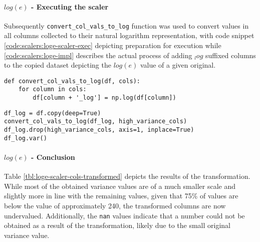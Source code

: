 \paragraph{$log(e)$ - Executing the scaler}
Subsequently \texttt{convert\_col\_vals\_to\_log} function was used to convert values in all columns collected to their natural logarithm representation, with code snippet \ref{code:scalers:loge-scaler-exec} depicting preparation for execution while \ref{code:scalers:loge-impl} describes the actual process of adding $_log$ suffixed columns to the copied dataset depicting the $log(e)$ value of a given original. 

\begin{code}
\label{code:scalers:loge-impl}
\begin{verbatim}
def convert_col_vals_to_log(df, cols):
    for column in cols:
        df[column + '_log'] = np.log(df[column])
\end{verbatim}
\end{code}

\begin{code}
\label{code:scalers:loge-scaler-exec}
\begin{verbatim}
df_log = df.copy(deep=True)
convert_col_vals_to_log(df_log, high_variance_cols)
df_log.drop(high_variance_cols, axis=1, inplace=True)
df_log.var()
\end{verbatim}
\end{code}

\paragraph{$log(e)$ - Conclusion}
Table \ref{tbl:loge-scaler-cols-transformed} depicts the results of the transformation. While most of the obtained variance values are of a much smaller scale and slightly more in line with the remaining values, given that 75\% of values are below the value of approximately 240, the transformed columns are now undervalued. 
Additionally, the \texttt{nan} values indicate that a number could not be obtained as a result of the transformation, likely due to the small original variance value. 


